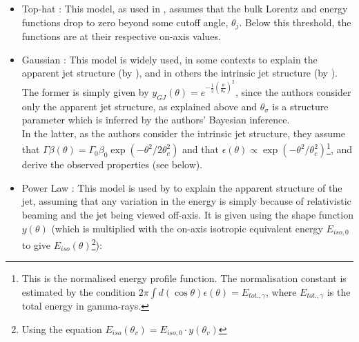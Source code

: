     \begin{itemize}

        \item Top-hat : This model, as used in \cite{saleem_energetics_2020},
            assumes that the bulk Lorentz and energy functions drop to zero
            beyond some cutoff angle, $\theta_j$. Below this threshold, the
            functions are at their respective on-axis values.

       \item Gaussian : This model is widely used, in some contexts to explain
           the apparent jet structure (by \cite{hayes_comparing_2020}), and in
           others the intrinsic jet structure (by
           \cite{saleem_energetics_2020}). The former is simply given by
           $y_{GJ}(\theta) = e^{- \frac{1}{2} \left(
           \frac{\theta}{\theta_{\sigma}} \right)^2}$, since the authors
           consider only the apparent jet structure, as explained above and
           $\theta_\sigma$ is a structure parameter which is inferred by the
           authors' Bayesian inference.\\
           In the latter, as the authors consider the intrinsic jet structure,
           they assume that $\Gamma \beta (\theta)
           = \Gamma_0 \beta_0 \exp\left(- \theta^2 / 2\theta_c^2\right)$ and
           that $\epsilon (\theta) \propto \exp(- \theta^2 /
           \theta_c^2)$\footnote{This is the normalised energy profile function.
           The normalisation constant is estimated by the condition $2\pi \int
           d(\cos \theta) \epsilon(\theta) = E_{tot., \gamma}$, where $E_{tot.,
           \gamma}$ is the total energy in gamma-rays.}, and derive the observed
           properties (see below).

        \item Power Law : This model is used by \cite{hayes_comparing_2020} to
            explain the apparent structure of the jet, assuming that any
            variation in the energy is simply because of relativistic beaming
            and the jet being viewed off-axis. It is given using the shape
            function $y(\theta)$ (which is multiplied with the on-axis isotropic
            equivalent energy $E_{iso, 0}$ to give
            $E_{iso}(\theta)$\footnote{Using the equation $E_{iso}(\theta_v) =
            E_{iso, 0} \cdot y(\theta_v)$}):


\end{itemize}
